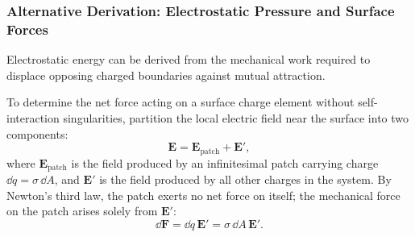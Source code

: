 \subsubsection{Alternative Derivation: Electrostatic Pressure and Surface Forces}

Electrostatic energy can be derived from the mechanical work required to displace opposing charged boundaries against mutual attraction.

\begin{center}
\end{center}

To determine the net force acting on a surface charge element without self-interaction singularities, partition the local electric field near the surface into two components:
\begin{equation}
    \bm{E} = \bm{E}_{\text{patch}} + \bm{E}',
\end{equation}
where \(\bm{E}_{\text{patch}}\) is the field produced by an infinitesimal patch carrying charge \(\dd q = \sigma\,\dd A\), and \(\bm{E}'\) is the field produced by all other charges in the system. By Newton's third law, the patch exerts no net force on itself; the mechanical force on the patch arises solely from \(\bm{E}'\):
\begin{equation}
    \dd\bm{F} = \dd q\,\bm{E}' = \sigma\,\dd A\,\bm{E}'.
\end{equation}

